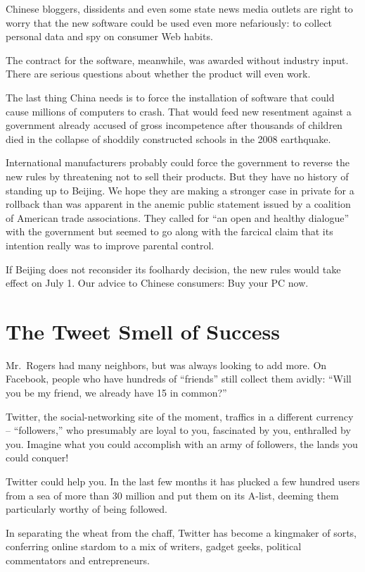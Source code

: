 ﻿\documentclass[12pt,a4paper,onecolumn]{article}
\begin{document}
Chinese bloggers, dissidents and even some state news media outlets are right to worry that the new
software could be used even more nefariously: to collect personal data and spy on consumer Web
habits.

The contract for the software, meanwhile, was awarded without industry input. There are serious
questions about whether the product will even work.

The last thing China needs is to force the installation of software that could cause millions of
computers to crash. That would feed new resentment against a government already accused of gross
incompetence after thousands of children died in the collapse of shoddily constructed schools in the
2008 earthquake.

International manufacturers probably could force the government to reverse the new rules by
threatening not to sell their products. But they have no history of standing up to Beijing. We hope
they are making a stronger case in private for a rollback than was apparent in the anemic public
statement issued by a coalition of American trade associations. They called for ``an open and
healthy dialogue'' with the government but seemed to go along with the farcical claim that its
intention really was to improve parental control.

If Beijing does not reconsider its foolhardy decision, the new rules would take effect on July 1.
Our advice to Chinese consumers: Buy your PC now.

\section{The Tweet Smell of Success}

Mr.~Rogers had many neighbors, but was always looking to add more. On Facebook, people who have
hundreds of ``friends'' still collect them avidly: ``Will you be my friend, we already have 15 in
common?''

Twitter, the social-networking site of the moment, traffics in a different currency --
``followers,'' who presumably are loyal to you, fascinated by you, enthralled by you. Imagine what
you could accomplish with an army of followers, the lands you could conquer!

Twitter could help you. In the last few months it has plucked a few hundred users from a sea of more
than 30 million and put them on its A-list, deeming them particularly worthy of being followed.

In separating the wheat from the chaff, Twitter has become a kingmaker of sorts, conferring online
stardom to a mix of writers, gadget geeks, political commentators and entrepreneurs.
\end{document}
